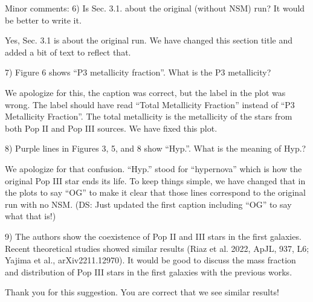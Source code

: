 \documentclass[11pt]{article}
\begin{document}
\begin{tcolorbox}[colback={lightgray}]
    Minor comments:
    6)      Is Sec. 3.1. about the original (without NSM) run? It would be better to write it.
\end{tcolorbox}

Yes, Sec. 3.1 is about the original run. We have changed this section title and added a bit of text to reflect that.

\begin{tcolorbox}[colback={lightgray}]
    7)      Figure 6 shows “P3 metallicity fraction”. What is the P3 metallicity?
\end{tcolorbox}

We apologize for this, the caption was correct, but the label in the plot was wrong. The label should have read ``Total Metallicity Fraction'' instead of ``P3 Metallicity Fraction''. The total metallicity is the metallicity of the stars from both Pop II and Pop III sources. We have fixed this plot.

\begin{tcolorbox}[colback={lightgray}]
    8)      Purple lines in Figures 3, 5, and 8 show “Hyp.”. What is the meaning of Hyp.?
\end{tcolorbox}

We apologize for that confusion. ``Hyp.'' stood for ``hypernova'' which is how the original Pop III star ends its life. To keep things simple, we have changed that in the plots to say ``OG'' to make it clear that those lines correspond to the original run with no NSM.   (DS: Just updated the first caption including ``OG'' to say what that is!)

\begin{tcolorbox}[colback={lightgray}]
    9)      The authors show the coexistence of Pop II and III stars in the first galaxies. Recent theoretical studies showed similar results (Riaz et al. 2022, ApJL, 937, L6; Yajima et al., arXiv2211.12970). It would be good to discuss the mass fraction and distribution of Pop III stars in the first galaxies with the previous works. 
\end{tcolorbox}

Thank you for this suggestion. You are correct that we see similar results! 
\end{document}
